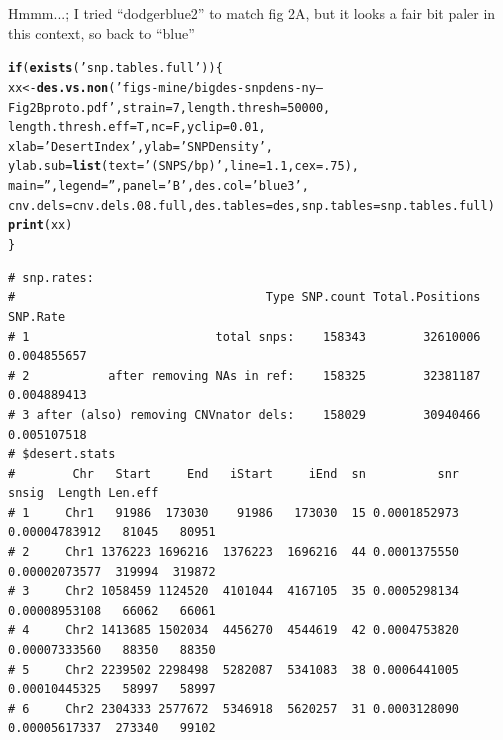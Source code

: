 \documentclass{article}\usepackage[]{graphicx}\usepackage[]{color}
\makeatletter
\newcommand{\hlnum}[1]{\textcolor[rgb]{0.686,0.059,0.569}{#1}}%
\newcommand{\hlstr}[1]{\textcolor[rgb]{0.192,0.494,0.8}{#1}}%
\newcommand{\hlstd}[1]{\textcolor[rgb]{0.345,0.345,0.345}{#1}}%
\newcommand{\hlkwa}[1]{\textcolor[rgb]{0.161,0.373,0.58}{\textbf{#1}}}%
\newcommand{\hlkwb}[1]{\textcolor[rgb]{0.69,0.353,0.396}{#1}}%
\newcommand{\hlkwc}[1]{\textcolor[rgb]{0.333,0.667,0.333}{#1}}%
\newcommand{\hlkwd}[1]{\textcolor[rgb]{0.737,0.353,0.396}{\textbf{#1}}}%
\newenvironment{kframe}{%
 \def\at@end@of@kframe{}%
 \ifinner\ifhmode%
  \def\at@end@of@kframe{\end{minipage}}%
  \begin{minipage}{\columnwidth}%
 \fi\fi%
 \def\FrameCommand##1{\hskip\@totalleftmargin \hskip-\fboxsep
 \colorbox{shadecolor}{##1}\hskip-\fboxsep
     \hskip-\linewidth \hskip-\@totalleftmargin \hskip\columnwidth}%
 \MakeFramed {\advance\hsize-\width
   \@totalleftmargin\z@ \linewidth\hsize
   \@setminipage}}%
 {\par\unskip\endMakeFramed%
 \at@end@of@kframe}
\newenvironment{knitrout}{}{} %
\makeatother
\begin{document}
{\footnotesize Hmmm...; I tried ``dodgerblue2'' to match fig 2A, but it looks a fair bit paler in this context, so back to ``blue''}

\begin{knitrout}\footnotesize
{}\color{fgcolor}\begin{kframe}
\begin{alltt}
\hlkwa{if}\hlstd{(}\hlkwd{exists}\hlstd{(}\hlstr{'snp.tables.full'}\hlstd{))\{}
  \hlstd{xx} \hlkwb{<-} \hlkwd{des.vs.non}\hlstd{(}\hlstr{'figs-mine/bigdes-snpdens-ny--Fig2Bproto.pdf'}\hlstd{,} \hlkwc{strain}\hlstd{=}\hlnum{7}\hlstd{,} \hlkwc{length.thresh}\hlstd{=}\hlnum{50000}\hlstd{,}
                   \hlkwc{length.thresh.eff}\hlstd{=T,} \hlkwc{nc}\hlstd{=F,} \hlkwc{yclip}\hlstd{=}\hlnum{0.01}\hlstd{,}
                   \hlkwc{xlab}\hlstd{=}\hlstr{'Desert Index'}\hlstd{,} \hlkwc{ylab}\hlstd{=}\hlstr{'SNP Density'}\hlstd{,}
                   \hlkwc{ylab.sub}\hlstd{=}\hlkwd{list}\hlstd{(}\hlkwc{text}\hlstd{=}\hlstr{'(SNPS / bp)'}\hlstd{,} \hlkwc{line}\hlstd{=}\hlnum{1.1}\hlstd{,} \hlkwc{cex}\hlstd{=}\hlnum{.75}\hlstd{),}
                   \hlkwc{main}\hlstd{=}\hlstr{''}\hlstd{,} \hlkwc{legend}\hlstd{=}\hlstr{''}\hlstd{,} \hlkwc{panel}\hlstd{=}\hlstr{'B'}\hlstd{,}  \hlkwc{des.col}\hlstd{=}\hlstr{'blue3'}\hlstd{,}
                   \hlkwc{cnv.dels}\hlstd{=cnv.dels.08.full,} \hlkwc{des.tables}\hlstd{=des,} \hlkwc{snp.tables}\hlstd{=snp.tables.full)}
  \hlkwd{print}\hlstd{(xx)}
\hlstd{\}}
\end{alltt}
\begin{verbatim}
# snp.rates:
#                                   Type SNP.count Total.Positions    SNP.Rate
# 1                          total snps:    158343        32610006 0.004855657
# 2           after removing NAs in ref:    158325        32381187 0.004889413
# 3 after (also) removing CNVnator dels:    158029        30940466 0.005107518
# $desert.stats
#        Chr   Start     End   iStart     iEnd  sn          snr         snsig  Length Len.eff
# 1     Chr1   91986  173030    91986   173030  15 0.0001852973 0.00004783912   81045   80951
# 2     Chr1 1376223 1696216  1376223  1696216  44 0.0001375550 0.00002073577  319994  319872
# 3     Chr2 1058459 1124520  4101044  4167105  35 0.0005298134 0.00008953108   66062   66061
# 4     Chr2 1413685 1502034  4456270  4544619  42 0.0004753820 0.00007333560   88350   88350
# 5     Chr2 2239502 2298498  5282087  5341083  38 0.0006441005 0.00010445325   58997   58997
# 6     Chr2 2304333 2577672  5346918  5620257  31 0.0003128090 0.00005617337  273340   99102

\end{verbatim}
\end{kframe}
\end{knitrout}
\end{document}
